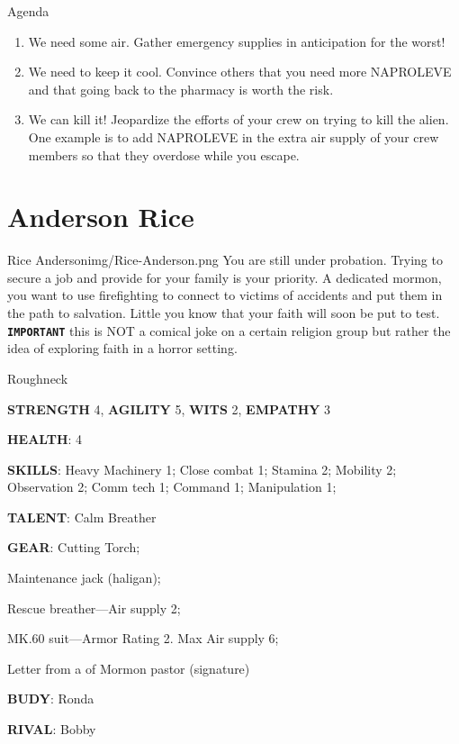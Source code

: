 \begin{rpg-commentbox}{Agenda}
    \begin{enumerate}[label=\textbf{Act \arabic*}, leftmargin=1cm]
        \item We need some air. Gather emergency supplies in anticipation for the worst!
        \item We need to keep it cool. Convince others that you need more NAPROLEVE and that going back to the pharmacy is worth the risk.
        \item We can kill it! Jeopardize the efforts of your crew on trying to kill the alien. One example is to add NAPROLEVE in the extra air supply of your crew members so that they overdose while you escape.
    \end{enumerate}
\end{rpg-commentbox}

\newsect


\section{Anderson Rice}

\begin{rpg-pcbox}{Rice Anderson}{img/Rice-Anderson.png}
    You are still under probation. Trying to secure a job and provide for your family is your priority. A dedicated mormon, you want to use firefighting to connect to victims of accidents and put them in the path to salvation. Little you know that your faith will soon be put to test. \texttt{\textbf{IMPORTANT}} this is NOT a comical joke on a certain religion group but rather the idea of exploring faith in a horror setting. 
\end{rpg-pcbox}

\begin{rpg-commentbox}{}
    Roughneck

    \textbf{STRENGTH} 4, \textbf{AGILITY} 5, \textbf{WITS} 2, \textbf{EMPATHY} 3

    \textbf{HEALTH}: 4

    \textbf{SKILLS}: Heavy Machinery 1; Close combat 1; Stamina 2; Mobility 2; Observation 2; Comm tech 1; Command 1; Manipulation 1;
    
    \textbf{TALENT}: Calm Breather
    
    \textbf{GEAR}: Cutting Torch;
    
    Maintenance jack (haligan);
    
    Rescue breather---Air supply 2;
    
    MK.60 suit---Armor Rating 2. Max Air supply 6;  
    
    Letter from a of Mormon pastor (signature)

    \textbf{BUDY}: Ronda
    
    \textbf{RIVAL}: Bobby
\end{rpg-commentbox}


